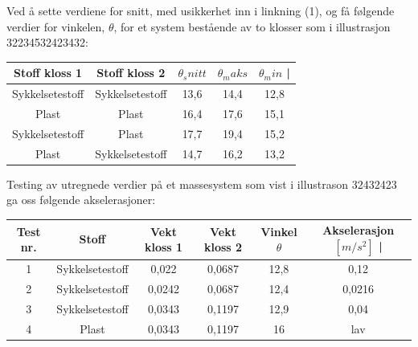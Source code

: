 \documentclass[10pt,a4paper]{report}
\begin{document}
Ved å sette verdiene for snitt, med usikkerhet inn i linkning (1), og få følgende verdier for vinkelen, $\theta$, for et system bestående av to klosser som i illustrasjon 32234532423432:

\begin{center}
  \begin{tabular}{| c | c | c | c | c |}
    \hline
    Stoff kloss 1 & Stoff kloss 2 & $\theta_snitt$ & $\theta_maks$ & $\theta_min$ | \\ \hline
    Sykkelsetestoff & Sykkelsetestoff & 13,6 & 14,4 & 12,8 \\ \hline
    Plast & Plast & 16,4  & 17,6 & 15,1 \\ \hline
    Sykkelsetestoff & Plast & 17,7 & 19,4 & 15,2 \\ \hline
    Plast & Sykkelsetestoff & 14,7 & 16,2 & 13,2  \\ \hline
  \end{tabular}
\end{center}

Testing av utregnede verdier på et massesystem som vist i illustrason 32432423 ga oss følgende akselerasjoner:

\begin{center}
  \begin{tabular}{| c | c | c | c | c  | c |}
    \hline
    Test nr. & Stoff & Vekt kloss 1 & Vekt kloss 2 & Vinkel $\theta$ & Akselerasjon $[m/s^2]$ | \\ \hline
    1 & Sykkelsetestoff & 0,022 & 0,0687 & 12,8 & 0,12 \\ \hline
    2 & Sykkelsetestoff & 0,0242  & 0,0687 & 12,4 & 0,0216 \\ \hline
    3 & Sykkelsetestoff & 0,0343 & 0,1197 & 12,9 & 0,04 \\ \hline
    4 & Plast & 0,0343 & 0,1197 & 16 & lav  \\ \hline
  \end{tabular}
\end{center}
\end{document}
